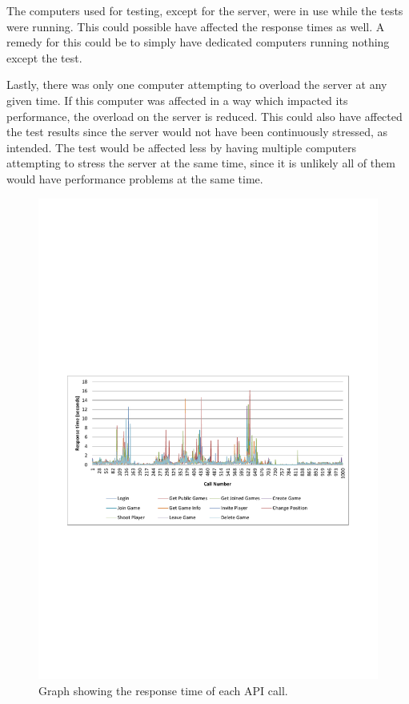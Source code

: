 The computers used for testing, except for the server, were in use while the tests were running. This could possible have affected the response times as well. A remedy for this could be to simply have dedicated computers running nothing except the test.

Lastly, there was only one computer attempting to overload the server at any given time. If this computer was affected in a way which impacted its performance, the overload on the server is reduced. This could also have affected the test results since the server would not have been continuously stressed, as intended. The test would be affected less by having multiple computers attempting to stress the server at the same time, since it is unlikely all of them would have performance problems at the same time.


\begin{figure}[H]
  \centering
  \includegraphics[width=\textwidth, clip=true, trim=0 22em 0 22em]{billeder/loadgraph.pdf}  
  \caption{Graph showing the response time of each API call.}
  \label{fig:loadgraph}
\end{figure}

